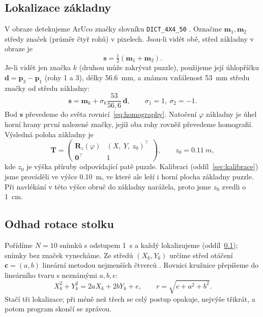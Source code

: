 \documentclass[11pt,a4paper]{article}
\newcommand{\R}{\mathbf{R}}
\newcommand{\T}{\mathbf{T}}
\begin{document}
\subsection{Lokalizace základny}
\label{sec:lokalizace}

V obraze detekujeme ArUco značky slovníku \texttt{DICT\_4X4\_50}
\cite{garrido2014,opencv}. Označme $\mathbf{m}_1,\mathbf{m}_2$ středy značek
(průměr čtyř rohů) v pixelech. Jsou-li vidět obě, střed základny v obraze je
\begin{equation}
  \mathbf{s} = \tfrac{1}{2}(\mathbf{m}_1 + \mathbf{m}_2).
\end{equation}
Je-li vidět jen značka $k$ (druhou může zakrývat puzzle), použijeme její
úhlopříčku $\mathbf{d} = \mathbf{p}_3 - \mathbf{p}_1$ (rohy 1 a 3), délky
\SI{56,6}{mm}, a známou vzdálenost \SI{53}{mm} středu značky od středu základny:
\begin{equation}
  \mathbf{s} = \mathbf{m}_k + \sigma_k \frac{53}{56{,}6}\,\mathbf{d},
  \qquad \sigma_1 = 1,\ \sigma_2 = -1.
\end{equation}
Bod $\mathbf{s}$ převedeme do světa rovnicí~\eqref{eq:homography}. Natočení
$\varphi$ základny je úhel horní hrany první nalezené značky, jejíž oba rohy
rovněž převedeme homografií. Výsledná poloha základny je
\begin{equation}
  \T = \begin{pmatrix} \R_z(\varphi) & (X,\ Y,\ z_0)^\top \\ \mathbf{0}^\top & 1 \end{pmatrix},
  \qquad z_0 = \SI{0,11}{m},
\end{equation}
kde $z_0$ je výška příruby odpovídající patě puzzle. Kalibraci
(oddíl~\ref{sec:kalibrace}) jsme prováděli ve výšce \SI{0,10}{m}, ve které
ale leží i horní plocha základny puzzle. Při navlékání v této výšce
obruč do základny narážela, proto jsme $z_0$ zvedli o \SI{1}{cm}.

\subsection{Odhad rotace stolku}
\label{sec:rotace}

Pořídíme $N = 10$ snímků s odstupem \SI{1}{s} a každý lokalizujeme
(oddíl~\ref{sec:lokalizace}); snímky bez značek vynecháme. Ze středů
$(X_k,Y_k)$ určíme střed otáčení $\mathbf{c} = (a,b)$ lineární metodou
nejmenších čtverců \cite{kasa1976}. Rovnici kružnice přepíšeme do lineárního tvaru s neznámými $a,b,e$:
\begin{equation}
  X_k^2 + Y_k^2 = 2aX_k + 2bY_k + e,
  \qquad r = \sqrt{e + a^2 + b^2}.
  \label{eq:circle}
\end{equation}
Stačí tři lokalizace; při méně než třech se celý postup opakuje, nejvýše
třikrát, a potom program skončí se zprávou.
\end{document}
